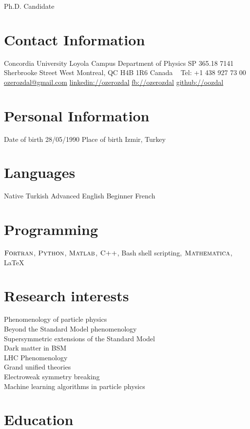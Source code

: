 \documentclass[]{friggeri-cv}
\begin{document}
       {Ph.D. Candidate}


\begin{aside}
  \section{Contact Information}
    Concordia University
    Loyola Campus
    Department of Physics SP 365.18
    7141 Sherbrooke Street West
    Montreal, QC  H4B 1R6
    Canada
    ~
    Tel: +1 438 927 73 00
    \href{mailto:ozerozdal@gmail.com}{ozerozdal@gmail.com}
    \href{http://www.linkedin.com/in/ozerozdal/}{linkedin://ozerozdal}
    \href{http://facebook.com/ozerozdal}{fb://ozerozdal}
    \href{http://github.com/oozdal}{github://oozdal}
  \section{Personal Information}
  	Date of birth 28/05/1990
  	Place of birth
  	Izmir, Turkey
  \section{Languages}
    Native Turkish
    Advanced English 
    Beginner French
  \section{Programming}
    $\textsc{Fortran}$, $\textsc{Python}$, 
    $\textsc{Matlab}$, $\textsc{C++}$,
    Bash shell scripting,
    $\textsc{Mathematica}$, LaTeX
\end{aside}

\section{Research interests}

Phenomenology of particle physics \\
Beyond the Standard Model phenomenology \\
Supersymmetric extensions of the Standard Model \\
Dark matter in BSM \\
LHC Phenomenology \\
Grand unified theories \\
Electroweak symmetry breaking \\
Machine learning algorithms in particle physics \\

\section{Education}
\end{document}
